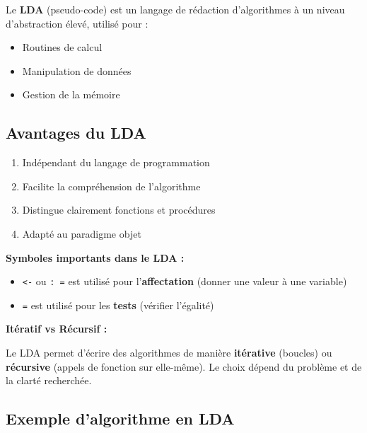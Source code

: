 \documentclass[12pt,a4paper]{article}
\begin{document}
\begin{definition}
Le \textbf{LDA} (pseudo-code) est un langage de rédaction d'algorithmes à un niveau d'abstraction élevé, utilisé pour : 
\begin{itemize}
    \item Routines de calcul
    \item Manipulation de données
    \item Gestion de la mémoire
\end{itemize}
\end{definition}

\subsection{Avantages du LDA}

\begin{important}
\begin{enumerate}
    \item \textcolor{titrebleu}{Indépendant} du langage de programmation
    \item \textcolor{defvert}{Facilite} la compréhension de l'algorithme
    \item \textcolor{algoviolet}{Distingue} clairement fonctions et procédures
    \item \textcolor{exempleorange}{Adapté} au paradigme objet
\end{enumerate}
\end{important}

\begin{notecours}
\textbf{Symboles importants dans le LDA :}

\begin{itemize}
    \item \texttt{<-} ou \texttt{: =} est utilisé pour l'\textbf{affectation} (donner une valeur à une variable)
    \item \texttt{=} est utilisé pour les \textbf{tests} (vérifier l'égalité)
\end{itemize}

\textbf{Itératif vs Récursif :}

Le LDA permet d'écrire des algorithmes de manière \textbf{itérative} (boucles) ou \textbf{récursive} (appels de fonction sur elle-même). Le choix dépend du problème et de la clarté recherchée.
\end{notecours}

\subsection{Exemple d'algorithme en LDA}
\end{document}
